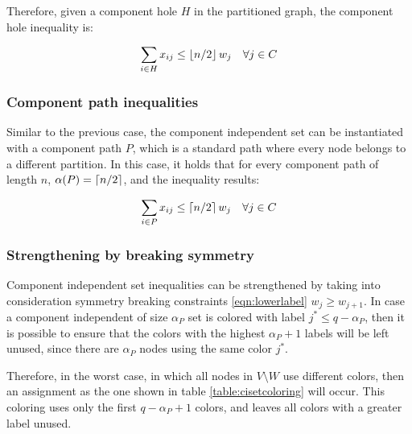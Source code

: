 Therefore, given a component hole $H$ in the partitioned graph, the component hole inequality is:

\begin{equation}
\label{ineq:chole}
\sum _{i \in H} x_{ij} \leq \left\lfloor n / 2 \right\rfloor w_{j} \quad \forall j \in C
\end{equation}

\subsubsection{Component path inequalities}

Similar to the previous case, the component independent set can be instantiated with a component path $P$, which is a standard path where every node belongs to a different partition. In this case, it holds that for every component path of length $n$, $\alpha(P) = \left\lceil n / 2 \right\rceil$, and the inequality results:

\begin{equation}
\label{ineq:cpath}
\sum _{i \in P} x_{ij} \leq \left\lceil n / 2 \right\rceil w_{j} \quad \forall j \in C
\end{equation}

\subsubsection{Strengthening by breaking symmetry}

Component independent set inequalities can be strengthened by taking into consideration symmetry breaking constraints \ref{eqn:lowerlabel} $w_j \geq w_{j+1}$. In case a component independent of size $\alpha_P$ set is colored with label $j^* \leq q - \alpha_P$, then it is possible to ensure that the colors with the highest $\alpha_P +1$ labels will be left unused, since there are $\alpha_P$ nodes using the same color $j^*$.

Therefore, in the worst case, in which all nodes in $V \setminus W$ use different colors, then an assignment as the one shown in table \ref{table:cisetcoloring} will occur. This coloring uses only the first $q - \alpha_P + 1$ colors, and leaves all colors with a greater label unused. 

